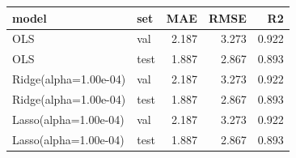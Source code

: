 \begin{tabular}{llrrr}
\toprule
model & set & MAE & RMSE & R2 \\
\midrule
OLS & val & 2.187 & 3.273 & 0.922 \\
OLS & test & 1.887 & 2.867 & 0.893 \\
Ridge(alpha=1.00e-04) & val & 2.187 & 3.273 & 0.922 \\
Ridge(alpha=1.00e-04) & test & 1.887 & 2.867 & 0.893 \\
Lasso(alpha=1.00e-04) & val & 2.187 & 3.273 & 0.922 \\
Lasso(alpha=1.00e-04) & test & 1.887 & 2.867 & 0.893 \\
\bottomrule
\end{tabular}
